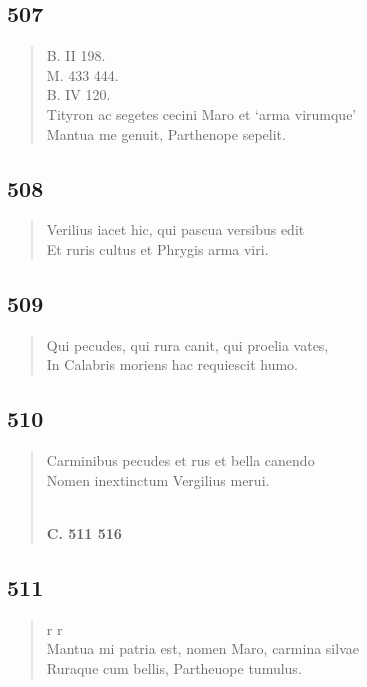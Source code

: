 \documentclass[11pt, a4paper]{report}
\begin{document}
            \subsection*{507}
      \begin{verse}
      B. II 198. \\ M. 433 444. \\ B. IV 120. \\ Tityron ac segetes cecini Maro et ‘arma virumque’ \\ Mantua me genuit, Parthenope sepelit. \\ 
      \end{verse}
  
            \subsection*{508}
      \begin{verse}
      Verilius iacet hic, qui pascua versibus edit \\ Et ruris cultus et Phrygis arma viri. \\ 
      \end{verse}
  
            \subsection*{509}
      \begin{verse}
      Qui pecudes, qui rura canit, qui proelia vates, \\ In Calabris moriens hac requiescit humo. \\ 
      \end{verse}
  
            \subsection*{510}
      \begin{verse}
      Carminibus pecudes et rus et bella canendo \\ Nomen inextinctum Vergilius merui. \\ 
        ﻿\pagebreak 
    \begin{center} \textbf{C. 511 516} \end{center} \marginpar{[63]} 
      \end{verse}
  
            \subsection*{511}
      \begin{verse}
      r r \\ Mantua mi patria est, nomen Maro, carmina silvae \\ Ruraque cum bellis, Partheuope tumulus. \\ 
      \end{verse}
  
\end{document}
